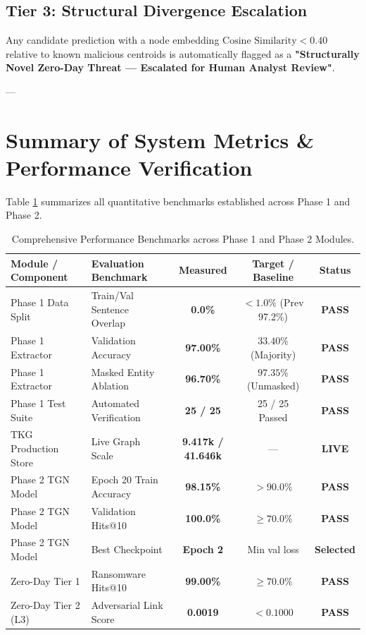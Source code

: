 \documentclass[11pt,a4paper]{article}
\begin{document}
\subsection{Tier 3: Structural Divergence Escalation}
Any candidate prediction with a node embedding $\text{Cosine Similarity} < 0.40$ relative to known malicious centroids is automatically flagged as a \textbf{"Structurally Novel Zero-Day Threat — Escalated for Human Analyst Review"}.

---

\section{Summary of System Metrics \& Performance Verification}

Table \ref{tab:system_metrics} summarizes all quantitative benchmarks established across Phase 1 and Phase 2.

\begin{table}[H]
\centering
\caption{Comprehensive Performance Benchmarks across Phase 1 and Phase 2 Modules.}
\label{tab:system_metrics}
\small
\begin{tabular}{llccc}
\toprule
\textbf{Module / Component} & \textbf{Evaluation Benchmark} & \textbf{Measured} & \textbf{Target / Baseline} & \textbf{Status} \\
\midrule
Phase 1 Data Split & Train/Val Sentence Overlap & \textbf{0.0\%} & $< 1.0\%$ (Prev 97.2\%) & \textbf{PASS} \\
Phase 1 Extractor & Validation Accuracy & \textbf{97.00\%} & $33.40\%$ (Majority) & \textbf{PASS} \\
Phase 1 Extractor & Masked Entity Ablation & \textbf{96.70\%} & $97.35\%$ (Unmasked) & \textbf{PASS} \\
Phase 1 Test Suite & Automated Verification & \textbf{25 / 25} & 25 / 25 Passed & \textbf{PASS} \\
TKG Production Store & Live Graph Scale & \textbf{9.417k / 41.646k} & — & \textbf{LIVE} \\
Phase 2 TGN Model & Epoch 20 Train Accuracy & \textbf{98.15\%} & $> 90.0\%$ & \textbf{PASS} \\
Phase 2 TGN Model & Validation Hits@10 & \textbf{100.0\%} & $\ge 70.0\%$ & \textbf{PASS} \\
Phase 2 TGN Model & Best Checkpoint & \textbf{Epoch 2} & Min val loss & \textbf{Selected} \\
Zero-Day Tier 1 & Ransomware Hits@10 & \textbf{99.00\%} & $\ge 70.0\%$ & \textbf{PASS} \\
Zero-Day Tier 2 (L3) & Adversarial Link Score & \textbf{0.0019} & $< 0.1000$ & \textbf{PASS} \\
\bottomrule
\end{tabular}
\end{table}
\end{document}
